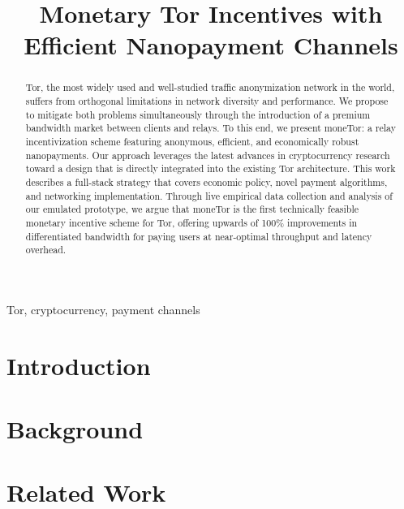 \documentclass[anonymous]{IEEEtran}
\begin{document}
\title{Monetary Tor Incentives with Efficient Nanopayment Channels} %
\maketitle

\begin{abstract}

  Tor, the most widely used and well-studied traffic anonymization network in
  the world, suffers from orthogonal limitations in network diversity and
  performance. We propose to mitigate both problems simultaneously through the
  introduction of a premium bandwidth market between clients and relays. To this
  end, we present moneTor: a relay incentivization scheme featuring anonymous,
  efficient, and economically robust nanopayments. Our approach leverages the
  latest advances in cryptocurrency research toward a design that is directly
  integrated into the existing Tor architecture. This work describes a
  full-stack strategy that covers economic policy, novel payment algorithms, and
  networking implementation. Through live empirical data collection and analysis
  of our emulated prototype, we argue that moneTor is the first technically
  feasible monetary incentive scheme for Tor, offering upwards of 100\%
  improvements in differentiated bandwidth for paying users at near-optimal
  throughput and latency overhead.

\end{abstract}

\begin{IEEEkeywords}
Tor, cryptocurrency, payment channels
\end{IEEEkeywords}

\section{Introduction}
\label{sec:introduction}


\section{Background}
\label{sec:background}


\section{Related Work}
\label{sec:related_work}

\end{document}
